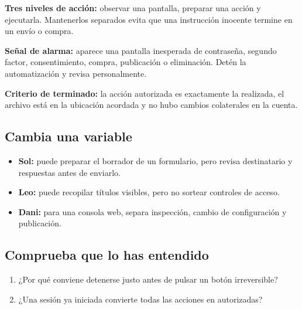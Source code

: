\documentclass[10pt,a4paper,openany]{book}
\providecommand{\tightlist}{\setlength{\itemsep}{0.18em}\setlength{\parskip}{0pt}}
\begin{document}
\textbf{Tres niveles de acción:} observar una pantalla, preparar una
acción y ejecutarla. Mantenerlos separados evita que una instrucción
inocente termine en un envío o compra.

\begin{warningbox}

\textbf{Señal de alarma:} aparece una pantalla inesperada de contraseña,
segundo factor, consentimiento, compra, publicación o eliminación. Detén
la automatización y revisa personalmente.

\end{warningbox}

\begin{successbox}

\textbf{Criterio de terminado:} la acción autorizada es exactamente la
realizada, el archivo está en la ubicación acordada y no hubo cambios
colaterales en la cuenta.

\end{successbox}

\subsection{Cambia una variable}\label{cambia-una-variable-9}

\begin{itemize}
\tightlist
\item
  \textbf{Sol:} puede preparar el borrador de un formulario, pero revisa
  destinatario y respuestas antes de enviarlo.
\item
  \textbf{Leo:} puede recopilar títulos visibles, pero no sortear
  controles de acceso.
\item
  \textbf{Dani:} para una consola web, separa inspección, cambio de
  configuración y publicación.
\end{itemize}

\subsection{Comprueba que lo has
entendido}\label{comprueba-que-lo-has-entendido-9}

\begin{enumerate}
\def\labelenumi{\arabic{enumi}.}
\tightlist
\item
  ¿Por qué conviene detenerse justo antes de pulsar un botón
  irreversible?
\item
  ¿Una sesión ya iniciada convierte todas las acciones en autorizadas?
\end{enumerate}
\end{document}
